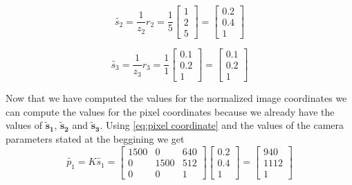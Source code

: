 \documentclass[12pt, letterpaper]{article}
\begin{document}
\begin{enumerate}
        \begin{equation*}
            {\tilde{s_2}=\frac{1}{z_2}r_2}=
            \frac{1}{5}\begin{bmatrix}
                        1\\
                        2\\
                        5 
                        \end{bmatrix}=
                        \begin{bmatrix}
                            0.2\\
                            0.4\\
                            1
                        \end{bmatrix}
        \end{equation*}

        \begin{equation*}
            {\tilde{s_3}=\frac{1}{z_3}r_3}=
            \frac{1}{1}\begin{bmatrix}
                        0.1\\
                        0.2\\
                        1 
                        \end{bmatrix}=
                        \begin{bmatrix}
                            0.1\\
                            0.2\\
                            1
                        \end{bmatrix}
        \end{equation*}

        Now that we have computed the values for the normalized image coordinates 
        we can compute the values for the pixel coordinates because we already have
        the values of $\bm{\tilde{s}_1}$, $\bm{\tilde{s}_2}$ and $\bm{\tilde{s}_3}$.
        Using \eqref{eq:pixel coordinate} and the values of the camera 
        parameters stated at the beggining we get
        \begin{equation*}
            {\tilde{p_1}=K\tilde{s_1}}=
            \begin{bmatrix}
                1500 & 0 & 640\\
                0 & 1500 & 512\\
                0 & 0 & 1
            \end{bmatrix}
            \begin{bmatrix}
                0.2\\
                0.4\\
                1
            \end{bmatrix}=
            \begin{bmatrix}
                940\\
                1112\\
                1
            \end{bmatrix}
        \end{equation*}


\end{enumerate}
\end{document}
